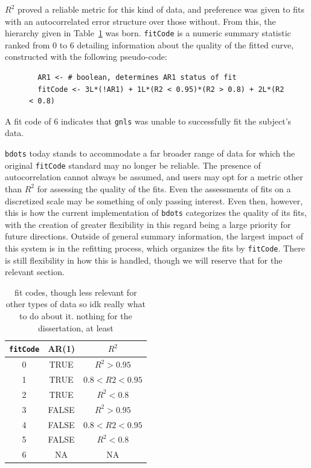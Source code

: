 \documentclass{article}
\newcommand{\xt}{\texttt}%
\begin{document}
$R^2$ proved a reliable metric for this kind of data, and preference was given to fits with an autocorrelated error structure over those without. From this, the hierarchy given in Table~\ref{tab:fit_codes} was born. \xt{fitCode} is a numeric summary statistic ranked from 0 to 6 detailing information about the quality of the fitted curve, constructed with the following pseudo-code:

\begin{singlespace}
\begin{figure}[H]
\centering
\begin{BVerbatim}
  AR1 <- # boolean, determines AR1 status of fit
  fitCode <- 3L*(!AR1) + 1L*(R2 < 0.95)*(R2 > 0.8) + 2L*(R2 < 0.8)
\end{BVerbatim}
\end{figure}
\end{singlespace}

A fit code of 6 indicates that \xt{gnls} was unable to successfully fit the 
subject's data. 

\xt{bdots} today stands to accommodate a far broader range of data for which the original \xt{fitCode} standard may no longer be reliable. The presence of autocorrelation cannot always be assumed, and users may opt for a metric other than $R^2$ for assessing the quality of the fits. Even the assessments of fits on a discretized scale may be something of only passing interest. Even then, however, this is how the current implementation of \xt{bdots} categorizes the quality of its fits, with the creation of greater flexibility in this regard being a large priority for future directions. Outside of general summary information, the largest impact of this system is in the refitting process, which organizes the fits by \xt{fitCode}. There is still flexibility in how this is handled, though we will reserve that for the relevant section. 

\begin{singlespace}
\begin{table}[H]
\centering
\def\arraystretch{1.5}
\begin{tabular}{|c|c|c|}
\hline
\xt{fitCode} & AR(1) & $R^2$ \\
\hline
0 & TRUE & $R^2 > 0.95$ \\
1 & TRUE & $0.8 < R2 < 0.95$ \\
2 & TRUE & $ R^2 <0.8$ \\
3 & FALSE & $R^2 >0.95$ \\
4 & FALSE & $0.8 < R2 < 0.95$ \\
5 & FALSE &$ R^2 <0.8$  \\
6 & NA & NA \\
\hline
\end{tabular}
\caption{fit codes, though less relevant for other types of data so idk really what to do about it. nothing for the dissertation, at least}
\label{tab:fit_codes}
\end{table}
\end{singlespace}
\end{document}
